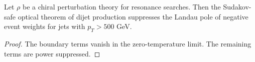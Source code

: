 \begin{corollary}\label{thm:2}
Let $\rho$ be a chiral perturbation theory for resonance searches. Then
the Sudakov-safe optical theorem of dijet production suppresses the
Landau pole of negative event weights for jets with $p_T > 500$ GeV.
\end{corollary}

\begin{proof}
The boundary terms vanish in the zero-temperature limit. The remaining
terms are power suppressed.
\end{proof}

